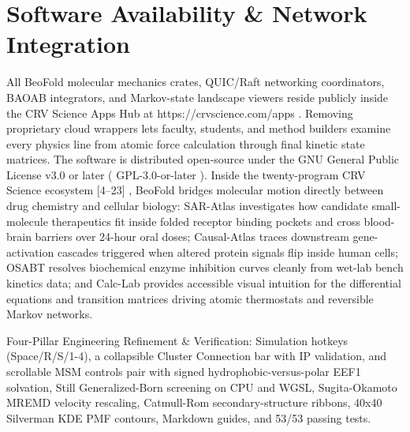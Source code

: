 \documentclass[10pt,letterpaper]{article}
\begin{document}
\section{Software Availability \& Network Integration}
All BeoFold molecular mechanics crates, QUIC/Raft networking coordinators, BAOAB integrators, and Markov-state landscape viewers reside publicly inside the CRV Science Apps Hub at https://crvscience.com/apps . Removing proprietary cloud wrappers lets faculty, students, and method builders examine every physics line from atomic force calculation through final kinetic state matrices. The software is distributed open-source under the GNU General Public License v3.0 or later ( GPL-3.0-or-later ). Inside the twenty-program CRV Science ecosystem [4--23] , BeoFold bridges molecular motion directly between drug chemistry and cellular biology: SAR-Atlas investigates how candidate small-molecule therapeutics fit inside folded receptor binding pockets and cross blood-brain barriers over 24-hour oral doses; Causal-Atlas traces downstream gene-activation cascades triggered when altered protein signals flip inside human cells; OSABT resolves biochemical enzyme inhibition curves cleanly from wet-lab bench kinetics data; and Calc-Lab provides accessible visual intuition for the differential equations and transition matrices driving atomic thermostats and reversible Markov networks.

Four-Pillar Engineering Refinement \& Verification: Simulation hotkeys (Space/R/S/1-4), a collapsible Cluster Connection bar with IP validation, and scrollable MSM controls pair with signed hydrophobic-versus-polar EEF1 solvation, Still Generalized-Born screening on CPU and WGSL, Sugita-Okamoto MREMD velocity rescaling, Catmull-Rom secondary-structure ribbons, 40x40 Silverman KDE PMF contours, Markdown guides, and 53/53 passing tests.
\end{document}
